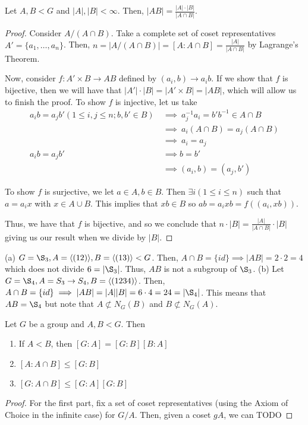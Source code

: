 \documentclass[11pt,leqno,oneside]{amsart}
\newcommand{\subgroup}{\mathrel{<}}
\begin{document}
    \begin{lem}
        Let $A,B \subgroup G$ and $|A|, |B| < \infty$. Then, $|AB| = \frac{|A| \cdot |B|}{|A \cap B|}$.
    \end{lem}
    \begin{proof}
        Consider $A/(A \cap B)$. Take a complete set of coset representatives $A' = \{a_1, \ldots, a_n\}$. Then, $n = |A/(A \cap B)| = [A : A \cap B] = \frac{|A|}{|A \cap B|}$ by Lagrange's Theorem.

        Now, consider $f: A' \times B \to AB$ defined by $(a_i,b) \to a_ib$. If
        we show that $f$ is bijective, then we will have that $|A'| \cdot |B| =
        |A' \times B| = |AB|$, which will allow us to finish the proof.
        To show $f$ is injective, let us take \begin{align*}
            a_ib = a_jb' (1 \leq i,j \leq n; b,b' \in B) & \ \implies \ a_j^{-1} a_i = b'b^{-1} \in A\cap B\\
            \ & \ \implies \ a_i(A \cap B) = a_j(A \cap B) \\
            \ & \ \implies \ a_i = a_j \\
            a_ib = a_jb' & \ \implies b = b' \\
            \ & \ \implies (a_i, b) = (a_j, b')
        \end{align*}

        To show $f$ is surjective, we let $a \in A, b \in B$. Then $\exists i
        (1 \leq i \leq n)$ such that $a=a_ix$ with $x \in A \cup B$. This
        implies that $xb \in B$ so $ab = a_ixb = f( (a_i,xb) )$.

        Thus, we have that $f$ is bijective, and so we conclude that $n \cdot
        |B| = \frac{|A|}{|A \cap B|} \cdot |B|$ giving us our result when we
        divide by $|B|$.
    \end{proof}
    \begin{example}
        (a) $G = \S_3, A = \langle (12) \rangle, B = \langle (13) \rangle
        \subgroup G$. Then, $A \cap B = \{ id \} \implies |AB| = 2 \cdot 2 = 4$
        which does not divide $6 = |\S_3|$. Thus, $AB$ is not a subgroup of
        $\S_3$.
        (b) Let $G=\S_4, A = S_3 \to S_4, B = \langle (1234) \rangle$. Then, $A \cap B = \{id\} \implies |AB| = |A||B| = 6 \cdot 4 = 24 = |\S_4|$. This means that $AB = \S_4$ but note that $A \not\subset N_G(B)$ and $B \not\subset N_G(A)$.
    \end{example}
    \begin{lem}
        Let $G$ be a group and $A,B \subgroup G$. Then
        \begin{enumerate}
            \item If $A \subgroup B$, then $[G:A] = [G:B][B:A]$
            \item $[A: A \cap B] \leq [G:B]$
            \item $[G: A \cap B] \leq [G:A][G:B]$
        \end{enumerate}
    \end{lem}
    \begin{proof}
       For the first part, fix a set of coset representatives (using the Axiom of Choice in the infinite case) for $G/A$. Then, given a coset $gA$, we can TODO
\end{proof}
\end{document}
